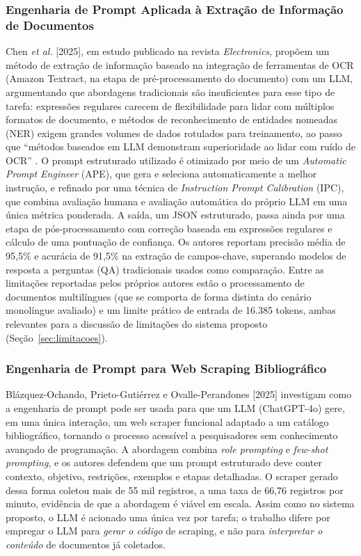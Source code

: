 \documentclass[12pt]{article}
\begin{document}
  \subsubsection{Engenharia de Prompt Aplicada à Extração de Informação de Documentos}
  Chen \emph{et al.} [2025], em estudo publicado na revista \emph{Electronics}, propõem um método de extração de informação baseado na integração de ferramentas de OCR (Amazon Textract, na etapa de pré-processamento do documento) com um LLM, argumentando que abordagens tradicionais são insuficientes para esse tipo de tarefa: expressões regulares carecem de flexibilidade para lidar com múltiplos formatos de documento, e métodos de reconhecimento de entidades nomeadas (NER) exigem grandes volumes de dados rotulados para treinamento, ao passo que ``métodos baseados em LLM demonstram superioridade ao lidar com ruído de OCR'' \cite{b6}. O prompt estruturado utilizado é otimizado por meio de um \emph{Automatic Prompt Engineer} (APE), que gera e seleciona automaticamente a melhor instrução, e refinado por uma técnica de \emph{Instruction Prompt Calibration} (IPC), que combina avaliação humana e avaliação automática do próprio LLM em uma única métrica ponderada. A saída, um JSON estruturado, passa ainda por uma etapa de pós-processamento com correção baseada em expressões regulares e cálculo de uma pontuação de confiança. Os autores reportam precisão média de 95,5\% e acurácia de 91,5\% na extração de campos-chave, superando modelos de resposta a perguntas (QA) tradicionais usados como comparação. Entre as limitações reportadas pelos próprios autores estão o processamento de documentos multilíngues (que se comporta de forma distinta do cenário monolíngue avaliado) e um limite prático de entrada de 16.385 tokens, ambas relevantes para a discussão de limitações do sistema proposto (Seção~\ref{sec:limitacoes}).

  \subsubsection{Engenharia de Prompt para Web Scraping Bibliográfico}
  Blázquez-Ochando, Prieto-Gutiérrez e Ovalle-Perandones [2025] investigam como a engenharia de prompt pode ser usada para que um LLM (ChatGPT-4o) gere, em uma única interação, um web scraper funcional adaptado a um catálogo bibliográfico, tornando o processo acessível a pesquisadores sem conhecimento avançado de programação. A abordagem combina \emph{role prompting} e \emph{few-shot prompting}, e os autores defendem que um prompt estruturado deve conter contexto, objetivo, restrições, exemplos e etapas detalhadas. O scraper gerado dessa forma coletou mais de 55 mil registros, a uma taxa de 66,76 registros por minuto, evidência de que a abordagem é viável em escala. Assim como no sistema proposto, o LLM é acionado uma única vez por tarefa; o trabalho difere por empregar o LLM para \emph{gerar o código} de scraping, e não para \emph{interpretar o conteúdo} de documentos já coletados.
\end{document}
